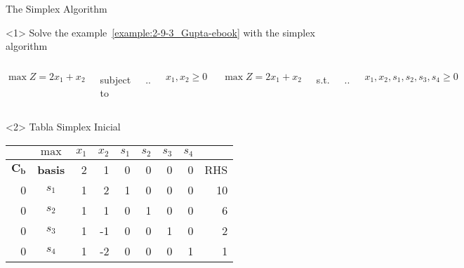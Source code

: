 \begin{frameExample}{The Simplex Algorithm}{}
  \begin{onlyenv}<1>
Solve the example~\ref{example:2-9-3_Gupta-ebook} with the simplex algorithm
  \begin{columns}
    \[ \max Z = 2x_1 + x_2 \]
      
    {\centering
      subject to

      \sysdelim..%

      \vspace{5mm}
      $x_1, x_2  \geq 0$
      \par}
    \[ \max Z = 2x_1 + x_2 \]

    {\centering
      s.t.%
      
        \sysdelim..%

      \vspace{5mm}
      $x_1, x_2, s_1, s_2, s_3, s_4  \geq 0$
      \par}
  \end{columns}
  \end{onlyenv}


\begin{onlyenv}<2>
  Tabla Simplex Inicial
  
  {\centering
\begin{tabular}{rc|rr|rrrr|r}
  &$\max$  & $x_1$ & $x_2$ & $s_1$ &$ s_2$ & $s_3$ & $s_4$ &  \\
  \toprule
  $\mathbf{C_b}$ & \textbf{basis} & 2 & 1 & 0 & 0 & 0 & 0 & RHS \\
  \midrule
0 & $s_1$ & 1 & 2 & 1 & 0 & 0 & 0 & 10 \\
0 & $s_2$ & 1 & 1 & 0 & 1 & 0 & 0 & 6 \\
0 & $s_3$ & 1 & -1 & 0 & 0 & 1 & 0 & 2 \\
  0 & $s_4$ & 1 & -2 & 0 & 0 & 0 & 1 & 1\\
  \bottomrule
\end{tabular}
  \par}
\end{onlyenv}


\end{frameExample}
